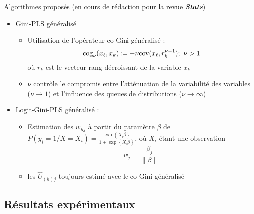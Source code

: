 \begin{frame}[t]{\mysubsectiontitle}
	Algorithmes proposés {\scriptsize (en cours de rédaction pour la revue \textit{\textbf{Stats}})}
\begin{itemize} \small
\setlength\itemsep{1.5em}

\item Gini-PLS généralisé
\begin{itemize} \scriptsize
	\item Utilisation de l'opérateur co-Gini généralisé : \[\text{cog}_\nu(x_\ell,x_k) := -\nu \text{cov}(x_\ell,r_{k}^{\nu-1}) ; \ \nu > 1\] où $r_{k}$ est le vecteur rang décroissant de la variable $x_k$
	
	\item $\nu$ contrôle le compromis entre l'atténuation de la variabilité des variables ($\nu \rightarrow 1$) et l'influence des queues de distributions ($\nu \rightarrow \infty$)	
\end{itemize}


\item Logit-Gini-PLS  généralisé : 
\begin{itemize} \scriptsize
	\item Estimation des $w_{hj}$ à partir du paramètre $\beta$ de $P(y_i = 1 / X = X_i) = \frac{\exp\left\{X_i \beta \right\}}{1+\exp\left\{ X_i \beta \right\}}$, où $X_i$ étant une observation
	\[w_j = \frac{\beta_j}{\| \beta\|}\]	
	\item les $\hat{U}_{(h)j}$ toujours estimé avec le co-Gini généralisé
\end{itemize} 
\end{itemize}
\end{frame}


\subsection{Résultats expérimentaux}

